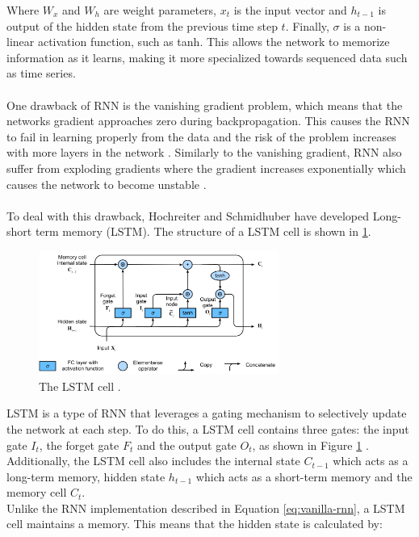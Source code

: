 Where $W_{x}$ and $W_{h}$ are weight parameters, $x_{t}$ is the input vector and $h_{t-1}$ is output of the hidden state from the previous time step $t$. Finally, $\sigma$ is a non-linear activation function, such as tanh. This allows the network to memorize information as it learns, making it more specialized towards sequenced data such as time series. 
\\\\
One drawback of RNN is the vanishing gradient problem, which means that the networks gradient approaches zero during backpropagation\cite{LSTM}. This causes the RNN to fail in learning properly from the data and the risk of the problem increases with more layers in the network \cite{diveLSTM}. Similarly to the vanishing gradient, RNN also suffer from exploding gradients where the gradient increases exponentially which causes the network to become unstable \cite{LSTM}.
\\\\
To deal with this drawback, Hochreiter and Schmidhuber \cite{LSTM} have developed Long-short term memory (LSTM). The structure of a LSTM cell is shown in \ref{fig:lstm-cell}. 

\begin{figure}[H]
    \centering
    \includegraphics[width=0.7\textwidth]{figures/lstm_cell.png}
    \caption{The LSTM cell \cite{diveLSTM}.}
    \label{fig:lstm-cell}
\end{figure}

LSTM is a type of RNN that leverages a gating mechanism to selectively update the network at each step. To do this, a LSTM cell contains three gates: the input gate $I_{t}$, the forget gate $F_{t}$ and the output gate $O_{t}$, as shown in Figure \ref{fig:lstm-cell} \cite{diveLSTM}. Additionally, the LSTM cell also includes the internal state $C_{t-1}$ which acts as a long-term memory, hidden state $h_{t-1}$ which acts as a short-term memory and the memory cell $C_{t}$. \\

Unlike the RNN implementation described in Equation \ref{eq:vanilla-rnn}, a LSTM cell maintains a memory. This means that the hidden state is calculated by:

